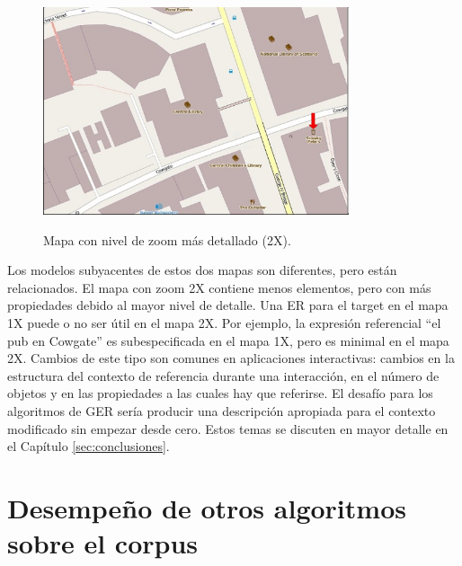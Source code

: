\begin{figure}[h]
\begin{center}
\includegraphics[width=9cm]{images/interface2-b.png}\\[0pt]
\caption{Mapa con nivel de zoom m\'as detallado (2X).}
\label{fig-with-zoom}
\end{center}
\end{figure}

Los modelos subyacentes de estos dos mapas son diferentes, pero est\'an relacionados. El mapa con zoom 2X contiene menos elementos, pero con m\'as propiedades debido al mayor nivel de detalle. Una ER para el target en el mapa 1X puede o no ser \'util en el mapa 2X. Por ejemplo, la expresi\'on referencial ``el pub en Cowgate'' es subespecificada en el mapa 1X, pero es minimal en el mapa 2X. Cambios de este tipo son comunes en aplicaciones interactivas: cambios en la estructura del contexto de referencia durante una interacci\'on, en el n\'umero de objetos y en las propiedades a las cuales hay que referirse. El desaf\'{i}o para los algoritmos de GER ser\'{i}a producir una descripci\'on apropiada para el contexto modificado sin empezar desde cero. Estos temas se discuten en mayor detalle en el Cap\'itulo \ref{sec:conclusiones}. 

\section{Desempe\~no de otros algoritmos sobre el corpus}
\label{corpus-evaluacion}

